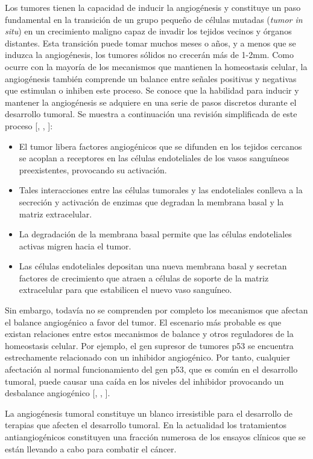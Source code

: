 \hspace{.1cm}Los tumores tienen la capacidad de inducir la angiogénesis y constituye un paso fundamental en la transición de un grupo pequeño de células mutadas (\textit{tumor in situ}) en un crecimiento maligno capaz de invadir los tejidos vecinos y órganos distantes. Esta transición puede tomar muchos meses o años, y a menos que se induzca la angiogénesis, los tumores sólidos no crecerán más de 1-2mm. Como ocurre con la mayoría de los mecanismos que mantienen la homeostasis celular, la angiogénesis también comprende un balance entre señales positivas y negativas que estimulan o inhiben este proceso. Se conoce que la habilidad para inducir y mantener la angiogénesis se adquiere en una serie de pasos discretos durante el desarrollo tumoral. Se muestra a continuación una revisión simplificada de este proceso [\cite{robins}, \cite{hanahan}, \cite{cancerbook}]:
\begin{itemize}
    \item El tumor libera factores angiogénicos que se difunden en los tejidos cercanos se acoplan a receptores en las células endoteliales de los vasos sanguíneos preexistentes, provocando su activación.
    \item Tales interacciones entre las células tumorales y las endoteliales conlleva a la secreción y activación de enzimas que degradan la membrana basal y la matriz extracelular.
    \item La degradación de la membrana basal permite que las células endoteliales activas migren hacia el tumor.
    \item Las células endoteliales depositan una nueva membrana basal y secretan factores de crecimiento que atraen a células de soporte de la matriz extracelular para que estabilicen el nuevo vaso sanguíneo.
\end{itemize}

Sin embargo, todavía no se comprenden por completo los mecanismos que afectan el balance angiogénico a favor del tumor. El escenario más probable es que existan relaciones entre estos mecanismos de balance y otros reguladores de la homeostasis celular. Por ejemplo, el gen supresor de tumores p53 se encuentra estrechamente relacionado con un inhibidor angiogénico. Por tanto, cualquier afectación al normal funcionamiento del gen p53, que es común en el desarrollo tumoral, puede causar una caída en los niveles del inhibidor provocando un desbalance angiogénico [\cite{robins}, \cite{hanahan}, \cite{cancerbook}].

\hspace{.1cm}La angiogénesis tumoral constituye un blanco irresistible para el desarrollo de terapias que afecten el desarrollo tumoral. En la actualidad los tratamientos antiangiogénicos constituyen una fracción numerosa de los ensayos clínicos que se están llevando a cabo para combatir el cáncer.

